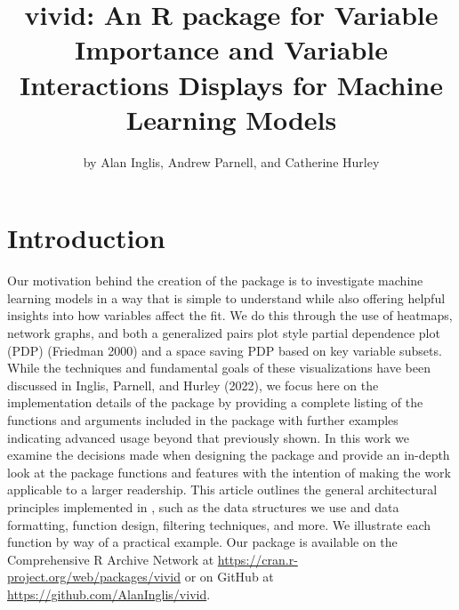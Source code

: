 \title{vivid: An R package for Variable Importance and Variable Interactions Displays for Machine Learning Models}
\author{by Alan Inglis, Andrew Parnell, and Catherine Hurley}

\maketitle


\hypertarget{introduction}{%
\section{Introduction}\label{introduction}}

Our motivation behind the creation of the  package is to investigate machine learning
models in a way that is simple to understand while also offering helpful
insights into how variables affect the fit. We do this through the use
of heatmaps, network graphs, and both a generalized pairs plot style
partial dependence plot (PDP) (Friedman 2000) and a space saving PDP based
on key variable subsets. While the techniques and fundamental goals of
these visualizations have been discussed in Inglis, Parnell, and Hurley (2022), we
focus here on the implementation details of the package by providing a
complete listing of the functions and arguments included in the 
package with further examples indicating advanced usage beyond that
previously shown. In this work we examine the decisions made when
designing the package and provide an in-depth look at the package
functions and features with the intention of making the work applicable
to a larger readership. This article outlines the general architectural
principles implemented in , such as the data structures we use and data
formatting, function design, filtering techniques, and more. We
illustrate each function by way of a practical example. Our package is
available on the Comprehensive R Archive Network at
\url{https://cran.r-project.org/web/packages/vivid} or on GitHub at
\url{https://github.com/AlanInglis/vivid}.

